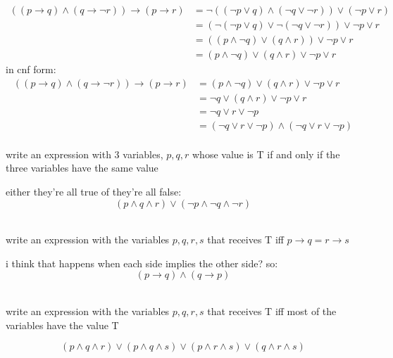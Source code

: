 \documentclass[a4paper,12pt]{article}
\begin{document}
\begin{question}
\begin{subquestion}
\begin{answer}
\begin{align*}
  ((p \rightarrow q) \land (q \rightarrow \lnot r)) \rightarrow (p \rightarrow r) &= \lnot((\lnot p \lor q) \land (\lnot q \lor \lnot r)) \lor (\lnot p \lor r)\\
  &= (\lnot(\lnot p \lor q) \lor \lnot(\lnot q \lor \lnot r)) \lor \lnot p \lor r\\
  &= ((p \land \lnot q) \lor (q \land r)) \lor \lnot p \lor r\\
  &= (p \land \lnot q) \lor (q \land r) \lor \lnot p \lor r
\end{align*}
in cnf form:\\
\begin{align*}
  ((p \rightarrow q) \land (q \rightarrow \lnot r)) \rightarrow (p \rightarrow r) &= (p \land \lnot q) \lor (q \land r) \lor \lnot p \lor r\\
  &= \lnot q \lor (q \land r) \lor \lnot p \lor r\\
  &= \lnot q \lor r \lor \lnot p\\
  &= (\lnot q \lor r \lor \lnot p) \land (\lnot q \lor r \lor \lnot p)\\
\end{align*}
\end{answer}
\end{subquestion}
\end{question}
\begin{question}
write an expression with 3 variables, \(p,q,r\) whose value is T if and only if the three variables have the same value\\
\begin{answer}
either they're all true of they're all false:\\
\[(p \land q \land r) \lor (\lnot p \land \lnot q \land \lnot r)\]\\
\end{answer}
\end{question}
\begin{question}
\begin{subquestion}
write an expression with the variables \(p,q,r,s\) that receives T iff \(p \rightarrow q = r \rightarrow s\)\\
\begin{answer}
i think that happens when each side implies the other side? so:\\
\[
(p \rightarrow q) \land (q \rightarrow p)
\]\\
\end{answer}
\end{subquestion}
\begin{subquestion}
write an expression with the variables \(p,q,r,s\) that receives T iff most of the variables have the value T\\
\begin{answer}
\[
(p \land q \land r) \lor (p \land q \land s) \lor (p \land r \land s) \lor (q \land r \land s)
\]\\
\end{answer}
\end{subquestion}
\end{question}
\end{document}
